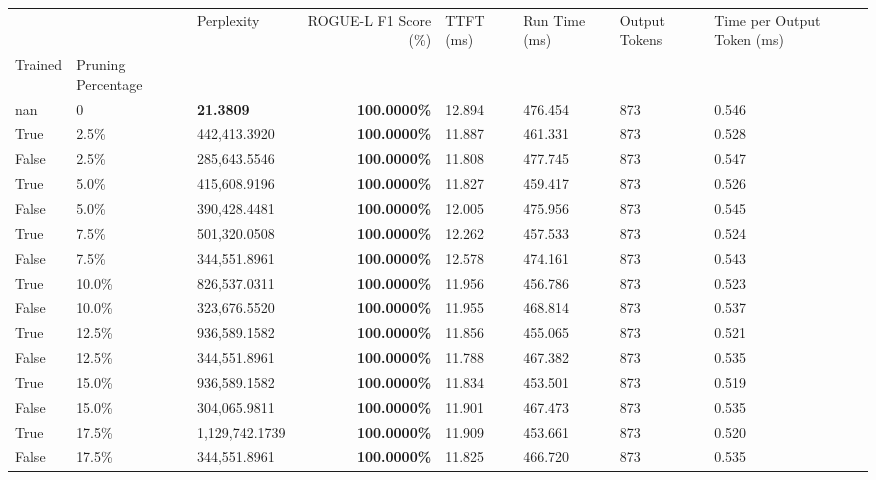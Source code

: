 \begin{table}[H]
{\label{tab:evaluation-pipeline-6}
\begin{tabular}{lllrllll}
\toprule
 &  & Perplexity & ROGUE-L F1 Score (\%) & TTFT (ms) & Run Time (ms) & Output Tokens & Time per Output Token (ms) \\
Trained & Pruning Percentage &  &  &  &  &  &  \\
\midrule
nan & 0 & \bfseries 21.3809 & \bfseries 100.0000\% & 12.894 & 476.454 & 873 & 0.546 \\
\cline{1-8}
True & 2.5\% & 442,413.3920 & \bfseries \color{red} 100.0000\% & 11.887 & 461.331 & 873 & 0.528 \\
\cline{1-8}
False & 2.5\% & 285,643.5546 & \bfseries \color{red} 100.0000\% & 11.808 & 477.745 & 873 & 0.547 \\
\cline{1-8}
True & 5.0\% & 415,608.9196 & \bfseries \color{red} 100.0000\% & 11.827 & 459.417 & 873 & 0.526 \\
\cline{1-8}
False & 5.0\% & 390,428.4481 & \bfseries \color{red} 100.0000\% & 12.005 & 475.956 & 873 & 0.545 \\
\cline{1-8}
True & 7.5\% & 501,320.0508 & \bfseries \color{red} 100.0000\% & 12.262 & 457.533 & 873 & 0.524 \\
\cline{1-8}
False & 7.5\% & 344,551.8961 & \bfseries \color{red} 100.0000\% & 12.578 & 474.161 & 873 & 0.543 \\
\cline{1-8}
True & 10.0\% & 826,537.0311 & \bfseries \color{red} 100.0000\% & 11.956 & 456.786 & 873 & 0.523 \\
\cline{1-8}
False & 10.0\% & 323,676.5520 & \bfseries \color{red} 100.0000\% & 11.955 & 468.814 & 873 & 0.537 \\
\cline{1-8}
True & 12.5\% & 936,589.1582 & \bfseries \color{red} 100.0000\% & 11.856 & 455.065 & 873 & 0.521 \\
\cline{1-8}
False & 12.5\% & 344,551.8961 & \bfseries \color{red} 100.0000\% & 11.788 & 467.382 & 873 & 0.535 \\
\cline{1-8}
True & 15.0\% & 936,589.1582 & \bfseries \color{red} 100.0000\% & 11.834 & 453.501 & 873 & 0.519 \\
\cline{1-8}
False & 15.0\% & 304,065.9811 & \bfseries \color{red} 100.0000\% & 11.901 & 467.473 & 873 & 0.535 \\
\cline{1-8}
True & 17.5\% & 1,129,742.1739 & \bfseries \color{red} 100.0000\% & 11.909 & 453.661 & 873 & 0.520 \\
\cline{1-8}
False & 17.5\% & 344,551.8961 & \bfseries \color{red} 100.0000\% & 11.825 & 466.720 & 873 & 0.535 \\

\end{tabular}}
\end{table}
